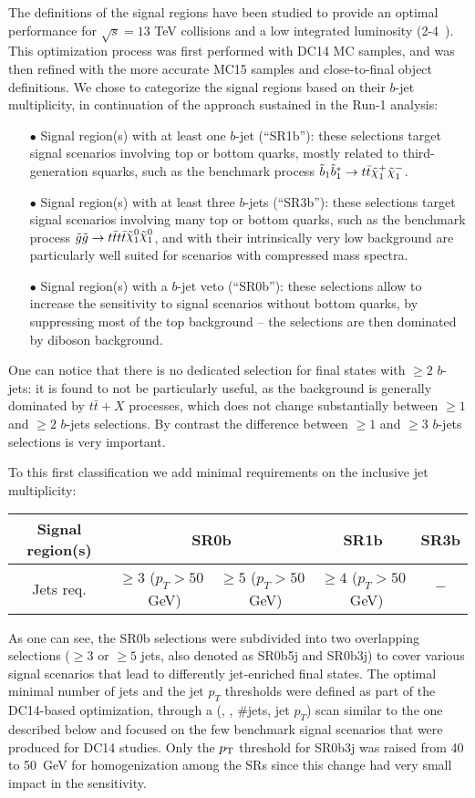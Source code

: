 \label{sec:SignalRegDef}

The definitions of the signal regions have been studied to provide an optimal performance for $\sqrt s=13$ TeV collisions and a low integrated luminosity (2-4~\ifb). 
This optimization process was first performed with DC14 MC samples, and was then refined with the more accurate MC15 samples and close-to-final object definitions. 
We chose to categorize the signal regions based on their $b$-jet multiplicity, in continuation of the approach sustained in the Run-1 analysis: 
\begin{itemize}
\item[$\bullet$] Signal region(s) with at least one $b$-jet (``SR1b''): these selections target signal scenarios involving top or bottom quarks, 
mostly related to third-generation squarks, such as the benchmark process $\sbot\sbot^*\to t\bar t\tilde\chi_1^+\tilde\chi_1^-$. 
\item[$\bullet$] Signal region(s) with at least three $b$-jets (``SR3b''): these selections target signal scenarios involving many top or bottom quarks, 
such as the benchmark process $\gluino\gluino\to t\bar tt\bar t\ninoone\ninoone$, 
and with their intrinsically very low background are particularly well suited for scenarios with compressed mass spectra. 
\item[$\bullet$] Signal region(s) with a $b$-jet veto (``SR0b''): these selections allow to increase the sensitivity to signal scenarios without bottom quarks, 
by suppressing most of the top background -- the selections are then dominated by diboson background. 
\end{itemize}
One can notice that there is no dedicated selection for final states with $\ge 2$ $b$-jets: 
it is found to not be particularly useful, as the background is generally dominated by $t\bar t+X$ processes, 
which does not change substantially between $\ge 1$ and $\ge 2$ $b$-jets selections. 
By contrast the difference between $\ge 1$ and $\ge 3$ $b$-jets selections is very important. 

To this first classification we add minimal requirements on the inclusive jet multiplicity: 
\begin{center}
\begin{tabular}{c|c|c|c|c}
Signal region(s) & \multicolumn{2}{c|}{SR0b} & SR1b & SR3b\\\hline
Jets req. & $\ge 3$ ($p_T>50$~GeV) & $\ge 5$ ($p_T>50$~GeV) & $\ge 4$ ($p_T>50$~GeV) & $-$\\
\end{tabular}
\end{center}
As one can see, the SR0b selections were subdivided into two overlapping selections ($\ge 3$ or $\ge 5$ jets, 
also denoted as SR0b5j and SR0b3j) to cover various signal scenarios that lead to differently jet-enriched final states. 
The optimal minimal number of jets and the jet $p_T$ thresholds were defined as part of the DC14-based optimization, through a (\meff, \met, \#jets, jet $p_T$) scan similar to the one described below 
and focused on the few benchmark signal scenarios that were produced for DC14 studies. Only the $p_{\mathrm{T}}$ threshold for SR0b3j was raised from 40 to 50~GeV for homogenization among the SRs since this change had very small impact in the sensitivity.

